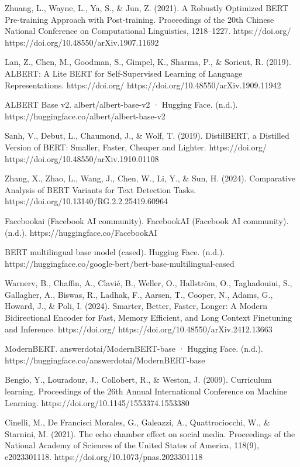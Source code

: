 \documentclass[licencjacka,en]{pracamgr}
\begin{document}
\begin{thebibliography}{99}
Zhuang, L., Wayne, L., Ya, S., \& Jun, Z. (2021). A Robustly Optimized BERT Pre-training Approach with Post-training. Proceedings of the 20th Chinese National Conference on Computational Linguistics, 1218–1227. https://doi.org/ https://doi.org/10.48550/arXiv.1907.11692 

Lan, Z., Chen, M., Goodman, S., Gimpel, K., Sharma, P., \& Soricut, R. (2019). ALBERT: A Lite BERT for Self-Supervised Learning of Language Representations. https://doi.org/ https://doi.org/10.48550/arXiv.1909.11942 

ALBERT Base v2. albert/albert-base-v2 · Hugging Face. (n.d.). https://huggingface.co/albert/albert-base-v2 

Sanh, V., Debut, L., Chaumond, J., \& Wolf, T. (2019). DistilBERT, a Distilled Version of BERT: Smaller, Faster, Cheaper and Lighter. https://doi.org/ https://doi.org/10.48550/arXiv.1910.01108 

Zhang, X., Zhao, L., Wang, J., Chen, W., Li, Y., \& Sun, H. (2024). Comparative Analysis of BERT Variants for Text Detection Tasks. https://doi.org/10.13140/RG.2.2.25419.60964 

Facebookai (Facebook AI community). FacebookAI (Facebook AI community). (n.d.). https://huggingface.co/FacebookAI 

BERT multilingual base model (cased). Hugging Face. (n.d.). https://huggingface.co/google-bert/bert-base-multilingual-cased 

Warnerv, B., Chaffin, A., Clavié, B., Weller, O., Hallström, O., Taghadouini, S., Gallagher, A., Biswas, R., Ladhak, F., Aarsen, T., Cooper, N., Adams, G., Howard, J., \& Poli, I. (2024). Smarter, Better, Faster, Longer: A Modern Bidirectional Encoder for Fast, Memory Efficient, and Long Context Finetuning and Inference. https://doi.org/ https://doi.org/10.48550/arXiv.2412.13663 

ModernBERT. answerdotai/ModernBERT-base · Hugging Face. (n.d.). https://huggingface.co/answerdotai/ModernBERT-base 

Bengio, Y., Louradour, J., Collobert, R., \& Weston, J. (2009). Curriculum learning. Proceedings of the 26th Annual International Conference on Machine Learning. https://doi.org/10.1145/1553374.1553380 

Cinelli, M., De Francisci Morales, G., Galeazzi, A., Quattrociocchi, W., \& Starnini, M. (2021). The echo chamber effect on social media. Proceedings of the National Academy of Sciences of the United States of America, 118(9), e2023301118. https://doi.org/10.1073/pnas.2023301118


\end{thebibliography}
\end{document}
